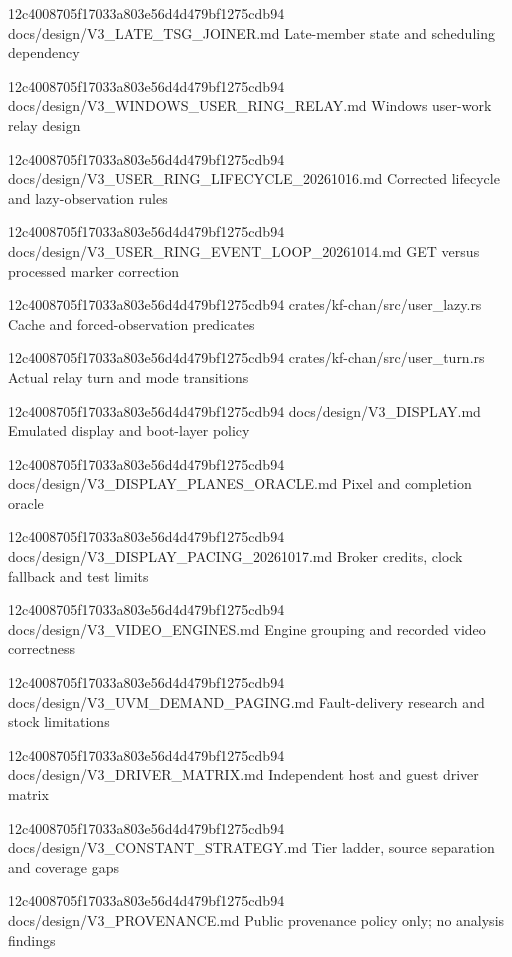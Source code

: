 \begin{description}[style=nextline]
{12c4008705f17033a803e56d4d479bf1275cdb94}
{docs/design/V3_LATE_TSG_JOINER.md}
{Late-member state and scheduling dependency}

{12c4008705f17033a803e56d4d479bf1275cdb94}
{docs/design/V3_WINDOWS_USER_RING_RELAY.md}
{Windows user-work relay design}

{12c4008705f17033a803e56d4d479bf1275cdb94}
{docs/design/V3_USER_RING_LIFECYCLE_20261016.md}
{Corrected lifecycle and lazy-observation rules}

{12c4008705f17033a803e56d4d479bf1275cdb94}
{docs/design/V3_USER_RING_EVENT_LOOP_20261014.md}
{GET versus processed marker correction}

{12c4008705f17033a803e56d4d479bf1275cdb94}
{crates/kf-chan/src/user_lazy.rs}
{Cache and forced-observation predicates}

{12c4008705f17033a803e56d4d479bf1275cdb94}
{crates/kf-chan/src/user_turn.rs}
{Actual relay turn and mode transitions}

{12c4008705f17033a803e56d4d479bf1275cdb94}
{docs/design/V3_DISPLAY.md}
{Emulated display and boot-layer policy}

{12c4008705f17033a803e56d4d479bf1275cdb94}
{docs/design/V3_DISPLAY_PLANES_ORACLE.md}
{Pixel and completion oracle}

{12c4008705f17033a803e56d4d479bf1275cdb94}
{docs/design/V3_DISPLAY_PACING_20261017.md}
{Broker credits, clock fallback and test limits}

{12c4008705f17033a803e56d4d479bf1275cdb94}
{docs/design/V3_VIDEO_ENGINES.md}
{Engine grouping and recorded video correctness}

{12c4008705f17033a803e56d4d479bf1275cdb94}
{docs/design/V3_UVM_DEMAND_PAGING.md}
{Fault-delivery research and stock limitations}

{12c4008705f17033a803e56d4d479bf1275cdb94}
{docs/design/V3_DRIVER_MATRIX.md}
{Independent host and guest driver matrix}

{12c4008705f17033a803e56d4d479bf1275cdb94}
{docs/design/V3_CONSTANT_STRATEGY.md}
{Tier ladder, source separation and coverage gaps}

{12c4008705f17033a803e56d4d479bf1275cdb94}
{docs/design/V3_PROVENANCE.md}
{Public provenance policy only; no analysis findings}


\end{description}

